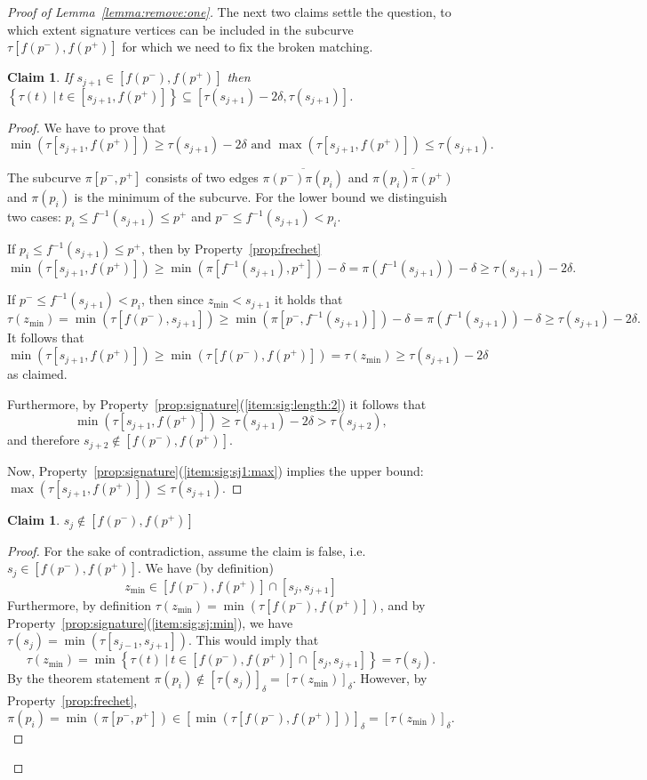 \documentclass[11pt, letter]{article}
\newtheorem{claim}[theorem]{Claim}
\newcommand{\lemref}[1]{Lemma~\ref{lemma:#1}}
\newcommand{\claimlab}[1]{\label{claim:#1}}
\newcommand{\propref}[1]{Property~\ref{prop:#1}}
\providecommand{\brc}[1]{\left\{ {#1} \right\}}
\newcommand{\setSubC}[4]{\ensuremath{\brc{ #1(#2) ~|~ #2 \in [#3,#4]} }}
\newcommand{\range}[2]{\ensuremath{[#1]_{#2}}}
\newcommand{\minSubC}[4]{\ensuremath{\min( #1[#3,#4])}}
\newcommand{\maxSubC}[4]{\ensuremath{\max( #1[#3,#4])}}
\begin{document}
\begin{proof}[Proof of \lemref{remove:one}]
The next two claims settle the question, to which extent signature vertices can be
included in the subcurve $\tau[f(p^{-}),f(p^{+})]$ for which we need to fix the broken matching. 

\begin{claim}
If $s_{j+1} \in [f(p^{-}),f(p^{+})]$ then
$\setSubC{\tau}{t}{s_{j+1}}{f(p^{+})} \subseteq [\tau(s_{j+1})-2\delta,
\tau(s_{j+1})]$.
\claimlab{descent:after:sj1}
\end{claim}
\begin{proof}
We have to prove that
\[\min(\tau[s_{j+1},f(p^+)])\geq \tau(s_{j+1})-2\delta \text{ and } \max(\tau[s_{j+1},f(p^+)])\leq \tau(s_{j+1}).\]

The subcurve $\pi[p^-, p^+]$ consists of two edges $\overline{\pi(p^-)\pi(p_i)}$ and $\overline{\pi(p_i)\pi(p^+)}$  and $\pi(p_i)$ is the minimum of the subcurve. For the lower bound we distinguish two cases: $p_i\leq f^{-1}(s_{j+1})\leq p^+$ and $p^-\leq f^{-1}(s_{j+1}) < p_i$. 

If $p_i\leq f^{-1}(s_{j+1})\leq p^+$, then by \propref{frechet}
\[\min(\tau[s_{j+1},f(p^+)])\geq \min(\pi[f^{-1}(s_{j+1}), p^+])-\delta = \pi(f^{-1}(s_{j+1})) -\delta \geq \tau(s_{j+1})-2\delta.\]

If $p^-\leq f^{-1}(s_{j+1}) < p_i$, then since $z_{\min}<s_{j+1}$ it holds that
\[\tau(z_{\min}) = \min(\tau[f(p^-),s_{j+1}]) \geq \min(\pi[p^-,f^{-1}(s_{j+1})]) - \delta = \pi(f^{-1}(s_{j+1})) - \delta \geq \tau(s_{j+1})-2\delta.\]
It follows that 
\[\min(\tau[s_{j+1},f(p^+)])\geq \min(\tau[f(p^-), f(p^+)]) =\tau(z_{\min}) \geq \tau(s_{j+1})-2\delta\] 
as claimed.



Furthermore, by \propref{signature}(\ref{item:sig:length:2}) it follows that
\[\min(\tau[s_{j+1},f(p^+)])\geq \tau(s_{j+1})-2\delta > \tau(s_{j+2}),\]
and therefore   $s_{j+2}\notin [f(p^{-}), f(p^{+})]$.

Now, \propref{signature}(\ref{item:sig:sj1:max}) implies the upper bound:
$ \maxSubC{\tau}{t}{s_{j+1}}{f(p^{+})} \leq \tau(s_{j+1}).$


\end{proof}


\begin{claim}
$s_j \notin [f(p^{-}),f(p^{+})]$
\claimlab{no:minimum}
\end{claim}
\begin{proof}
For the sake of contradiction, assume the claim is false, i.e. $s_j \in [f(p^{-}),f(p^{+})]$.
We have (by definition)
\[z_{\min} \in [f(p^{-}),f(p^{+})] \cap [s_j,s_{j+1}]\]
Furthermore, by definition 
$\tau(z_{\min}) = \minSubC{\tau}{t}{f(p^{-})}{f(p^{+})}$, and
by \propref{signature}(\ref{item:sig:sj:min}),
we have
$\tau(s_j) = \minSubC{\tau}{t}{s_{j-1}}{s_{j+1}}$.
This would imply that 
\[ \tau(z_{\min}) = \min \brc{\tau(t)~|~ t \in [f(p^{-}),f(p^{+})] \cap
[s_j,s_{j+1}]}  =
\tau(s_j).\]
By the theorem statement
$\pi(p_i) \notin \range{\tau(s_j)}{\delta} = \range{\tau(z_{\min})}{\delta}$. 
However, by \propref{frechet},
\[\pi(p_i) = \minSubC{\pi}{p}{p^{-}}{p^{+}} \in \range{
\minSubC{\tau}{t}{f(p^{-})}{f(p^{+})}}{\delta}=\range{\tau(z_{\min})}{\delta}. \]



\end{proof}
\end{proof}
\end{document}
